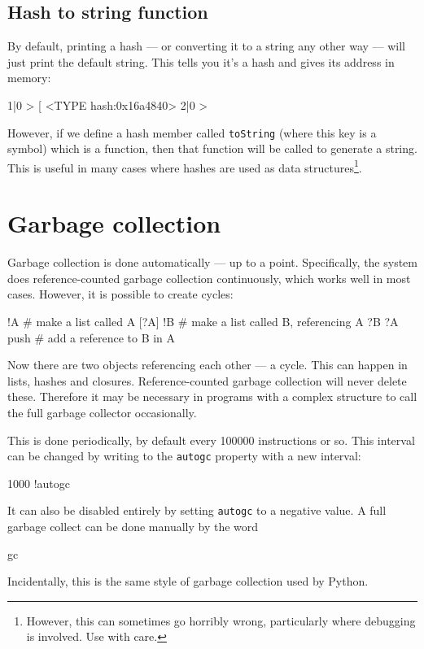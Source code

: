 \subsection{Hash to string function}
By default, printing a hash --- or converting it to a string any other way ---
will just print the default string. This tells you it's a hash and gives
its address in memory:
\begin{v}
1|0 > [%
<TYPE hash:0x16a4840>
2|0 > 
\end{v}
However, if we define a hash member called \verb+toString+ (where this
key is a symbol) which is a function, then that function will be called
to generate a string. This is useful in many cases where hashes are used
as data structures\footnote{However, this can sometimes go horribly
wrong, particularly where debugging is involved. Use with care.}.

\section{Garbage collection}
Garbage collection is done automatically --- up to a point. Specifically,
the system does reference-counted garbage collection continuously,
which works well in most cases. However, it is possible to
create cycles:
\begin{v}
    [] !A              # make a list called A
    [?A] !B            # make a list called B, referencing A
    ?B ?A push         # add a reference to B in A
\end{v}
Now there are two objects referencing each other --- a cycle. This can
happen in lists, hashes and closures. Reference-counted garbage
collection will never delete these. Therefore it may be necessary
in programs with a complex structure to call the full garbage collector
occasionally.

This is done periodically, by default every 100000 instructions or so.
This interval can be changed by writing to the \verb+autogc+ property
with a new interval:
\begin{v}
1000 !autogc
\end{v}
It can also be disabled entirely by setting \texttt{autogc} to a negative
value.
A full garbage collect can be done manually by the word
\begin{v}
    gc
\end{v}
Incidentally, this is
the same style of garbage collection used by Python.



